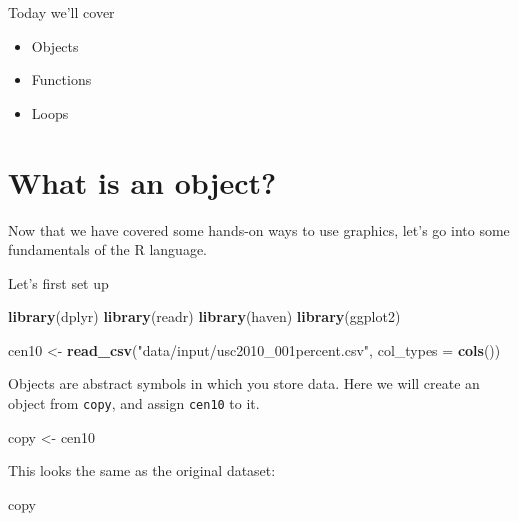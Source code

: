 \documentclass[]{book}
\newenvironment{Shaded}{\begin{snugshade}}{\end{snugshade}}
\newcommand{\DataTypeTok}[1]{\textcolor[rgb]{0.13,0.29,0.53}{#1}}
\newcommand{\KeywordTok}[1]{\textcolor[rgb]{0.13,0.29,0.53}{\textbf{#1}}}
\newcommand{\NormalTok}[1]{#1}
\newcommand{\StringTok}[1]{\textcolor[rgb]{0.31,0.60,0.02}{#1}}
\providecommand{\tightlist}{%
  \setlength{\itemsep}{0pt}\setlength{\parskip}{0pt}}
\theoremstyle{definition}
\theoremstyle{definition}
\theoremstyle{definition}
\theoremstyle{remark}
\begin{document}
\begin{Shaded}
\begin{Highlighting}[]
\begin{Shaded}
\begin{Highlighting}[]
\begin{Shaded}
\begin{Highlighting}[]
Today we'll cover

\begin{itemize}
\tightlist
\item
  Objects
\item
  Functions
\item
  Loops
\end{itemize}

\hypertarget{what-is-an-object}{%
\section{What is an object?}\label{what-is-an-object}}

Now that we have covered some hands-on ways to use graphics, let's go into some fundamentals of the R language.

Let's first set up

\begin{Shaded}
\begin{Highlighting}[]
\KeywordTok{library}\NormalTok{(dplyr)}
\KeywordTok{library}\NormalTok{(readr)}
\KeywordTok{library}\NormalTok{(haven)}
\KeywordTok{library}\NormalTok{(ggplot2)}
\end{Highlighting}
\end{Shaded}

\begin{Shaded}
\begin{Highlighting}[]
\NormalTok{cen10 <-}\StringTok{ }\KeywordTok{read_csv}\NormalTok{(}\StringTok{"data/input/usc2010_001percent.csv"}\NormalTok{, }\DataTypeTok{col_types =} \KeywordTok{cols}\NormalTok{())}
\end{Highlighting}
\end{Shaded}

Objects are abstract symbols in which you store data. Here we will create an object from \texttt{copy}, and assign \texttt{cen10} to it.

\begin{Shaded}
\begin{Highlighting}[]
\NormalTok{copy <-}\StringTok{ }\NormalTok{cen10 }
\end{Highlighting}
\end{Shaded}

This looks the same as the original dataset:

\begin{Shaded}
\begin{Highlighting}[]
\NormalTok{copy}
\end{Highlighting}
\end{Shaded}


\end{Highlighting}
\end{Shaded}
\end{Highlighting}
\end{Shaded}
\end{Highlighting}
\end{Shaded}
\end{document}
